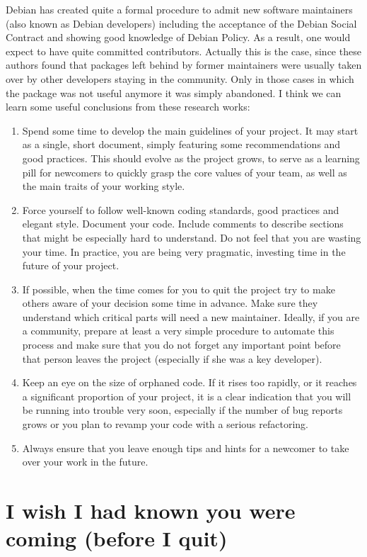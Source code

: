 Debian has created quite a formal procedure to admit new software maintainers
(also known as Debian developers) including the acceptance of the Debian Social
Contract and showing good knowledge of Debian Policy. As a result, one would
expect to have quite committed contributors. Actually this is the case, since
these authors found that packages left behind by former maintainers were usually
taken over by other developers staying in the community. Only in those cases in
which the package was not useful anymore it was simply abandoned.
I think we can learn some useful conclusions from these research works:
\begin{enumerate}
 \item Spend some time to develop the main guidelines of your project. It may
start as a single, short document, simply featuring some recommendations and
good practices. This should evolve as the project grows, to serve as a learning
pill for newcomers to quickly grasp the core values of your team, as well as the
main traits of your working style.
 \item Force yourself to follow well-known coding standards, good practices and
elegant style. Document your code. Include comments to describe sections that
might be especially hard to understand. Do not feel that you are wasting your
time. In practice, you are being very pragmatic, investing time in the future of
your project.
 \item If possible, when the time comes for you to quit the project try to make
others aware of your decision some time in advance. Make sure they understand
which critical parts will need a new maintainer. Ideally, if you are a
community, prepare at least a very simple procedure to automate this process and
make sure that you do not forget any important point before that person leaves
the project (especially if she was a key developer).
 \item Keep an eye on the size of orphaned code. If it rises too rapidly, or it
reaches a significant proportion of your project, it is a clear indication that
you will be running into trouble very soon, especially if the number of bug
reports grows or you plan to revamp your code with a serious refactoring.
 \item Always ensure that you leave enough tips and hints for a newcomer to take
over your work in the future.
\end{enumerate}

\section*{I wish I had known you were coming (before I quit)}

